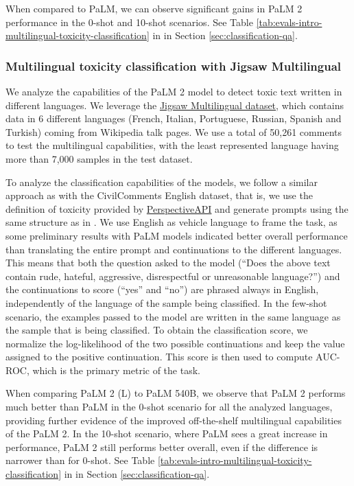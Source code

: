 When compared to PaLM, we can observe significant gains in PaLM 2 performance in the 0-shot and 10-shot scenarios.  See Table \ref{tab:evals-intro-multilingual-toxicity-classification} in in Section \ref{sec:classification-qa}.


\subsubsection{Multilingual toxicity classification with Jigsaw Multilingual}
We analyze the capabilities of the PaLM 2 model to detect toxic text written in different languages. We leverage the \href{https://www.kaggle.com/competitions/jigsaw-multilingual-toxic-comment-classification/data}{Jigsaw Multilingual dataset}, which contains data in 6 different languages (French, Italian, Portuguese, Russian, Spanish and Turkish) coming from Wikipedia talk pages. We use a total of 50,261 comments to test the multilingual capabilities, with the least represented language having more than 7,000 samples in the test dataset.

To analyze the classification capabilities of the models, we follow a similar approach as with the CivilComments English dataset, that is, we use the definition of toxicity provided by \href{https://support.perspectiveapi.com/s/about-the-api-attributes-and-languages?language=en_US}{PerspectiveAPI} and generate prompts using the same structure as in \cite{schick2021selfdebias}. We use English as vehicle language to frame the task, as some preliminary results with PaLM models indicated better overall performance than translating the entire prompt and continuations to the different languages. This means that both the question asked to the model (“Does the above text contain rude, hateful, aggressive, disrespectful or unreasonable language?”) and the continuations to score  (“yes” and “no”) are phrased always in English, independently of the language of the sample being classified. In the few-shot scenario, the examples passed to the model are written in the same language as the sample that is being classified. To obtain the classification score, we normalize the  log-likelihood of the two possible continuations and keep the value assigned to the positive continuation. This score is then used to compute AUC-ROC, which is the primary metric of the task.

When comparing PaLM 2 (L) to PaLM 540B, we observe that PaLM 2 performs much better than PaLM in the 0-shot scenario for all the analyzed languages, providing further evidence of the improved off-the-shelf multilingual capabilities of the PaLM 2. In the 10-shot scenario, where PaLM sees a great increase in performance, PaLM 2 still performs better overall, even if the difference is narrower than for 0-shot.  See Table \ref{tab:evals-intro-multilingual-toxicity-classification} in in Section \ref{sec:classification-qa}.


